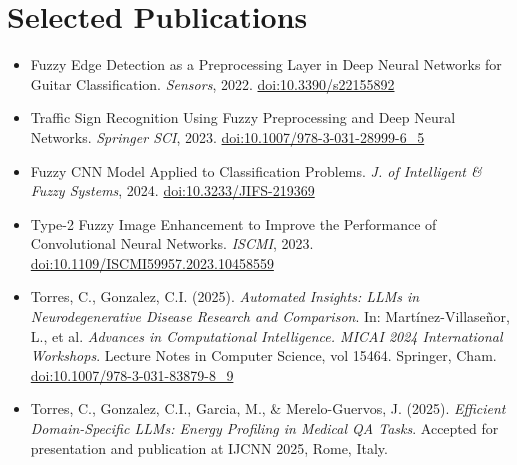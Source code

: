 \documentclass[letterpaper,11pt]{article}
\begin{document}
\section*{Selected Publications}
\begin{itemize}[leftmargin=0.15in]
  \item Fuzzy Edge Detection as a Preprocessing Layer in Deep Neural Networks for Guitar Classification. \textit{Sensors}, 2022. \href{https://doi.org/10.3390/s22155892}{doi:10.3390/s22155892}
  \item Traffic Sign Recognition Using Fuzzy Preprocessing and Deep Neural Networks. \textit{Springer SCI}, 2023. \href{https://doi.org/10.1007/978-3-031-28999-6_5}{doi:10.1007/978-3-031-28999-6\_5}
  \item Fuzzy CNN Model Applied to Classification Problems. \textit{J. of Intelligent \& Fuzzy Systems}, 2024. \href{http://doi.org/10.3233/JIFS-219369}{doi:10.3233/JIFS-219369}
  \item Type-2 Fuzzy Image Enhancement to Improve the Performance of Convolutional Neural Networks. \textit{ISCMI}, 2023. \href{http://doi.org/10.1109/ISCMI59957.2023.10458559}{doi:10.1109/ISCMI59957.2023.10458559}
  \item Torres, C., Gonzalez, C.I. (2025). \textit{Automated Insights: LLMs in Neurodegenerative Disease Research and Comparison}. In: Martínez-Villaseñor, L., et al. \textit{Advances in Computational Intelligence. MICAI 2024 International Workshops}. Lecture Notes in Computer Science, vol 15464. Springer, Cham. \href{https://doi.org/10.1007/978-3-031-83879-8_9}{doi:10.1007/978-3-031-83879-8\_9}
  \item Torres, C., Gonzalez, C.I., Garcia, M., \& Merelo-Guervos, J. (2025). \textit{Efficient Domain-Specific LLMs: Energy Profiling in Medical QA Tasks}. Accepted for presentation and publication at IJCNN 2025, Rome, Italy.
\end{itemize}

\end{document}
